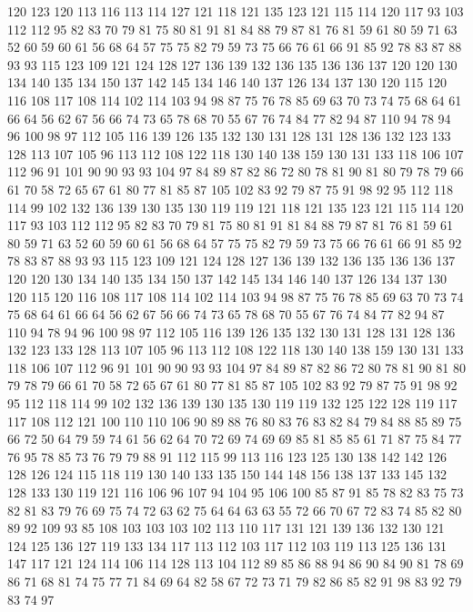 120 123 120 113 116 113 114 127 121 118 121 135 123 121 115 114 120 117 93 103
112 112 95 82 83 70 79 81 75 80 81 91 81 84 88 79 87 81 76 81
59 61 80 59 71 63 52 60 59 60 61 56 68 64 57 75 75 82 79 59
73 75 66 76 61 66 91 85 92 78 83 87 88 93 93 115 123 109 121 124
128 127 136 139 132 136 135 136 136 137 120 120 130 134 140 135 134 150 137 142
145 134 146 140 137 126 134 137 130 120 115 120 116 108 117 108 114 102 114 103
94 98 87 75 76 78 85 69 63 70 73 74 75 68 64 61 66 64 56 62
67 56 66 74 73 65 78 68 70 55 67 76 74 84 77 82 94 87 110 94
78 94 96 100 98 97 112 105 116 139 126 135 132 130 131 128 131 128 136 132
123 133 128 113 107 105 96 113 112 108 122 118 130 140 138 159 130 131 133 118
106 107 112 96 91 101 90 90 93 93 104 97 84 89 87 82 86 72 80 78
81 90 81 80 79 78 79 66 61 70 58 72 65 67 61 80 77 81 85 87
105 102 83 92 79 87 75 91 98 92 95 112 118 114 99 102 132 136 139 130
135 130 119 119 121 118 121 135 123 121 115 114 120 117 93 103 112 112 95 82
83 70 79 81 75 80 81 91 81 84 88 79 87 81 76 81 59 61 80 59
71 63 52 60 59 60 61 56 68 64 57 75 75 82 79 59 73 75 66 76
61 66 91 85 92 78 83 87 88 93 93 115 123 109 121 124 128 127 136 139
132 136 135 136 136 137 120 120 130 134 140 135 134 150 137 142 145 134 146 140
137 126 134 137 130 120 115 120 116 108 117 108 114 102 114 103 94 98 87 75
76 78 85 69 63 70 73 74 75 68 64 61 66 64 56 62 67 56 66 74
73 65 78 68 70 55 67 76 74 84 77 82 94 87 110 94 78 94 96 100
98 97 112 105 116 139 126 135 132 130 131 128 131 128 136 132 123 133 128 113
107 105 96 113 112 108 122 118 130 140 138 159 130 131 133 118 106 107 112 96
91 101 90 90 93 93 104 97 84 89 87 82 86 72 80 78 81 90 81 80
79 78 79 66 61 70 58 72 65 67 61 80 77 81 85 87 105 102 83 92
79 87 75 91 98 92 95 112 118 114 99 102 132 136 139 130 135 130 119 119
132 125 122 128 119 117 117 108 112 121 100 110 110 106 90 89 88 76 80 83
76 83 82 84 79 84 88 85 89 75 66 72 50 64 79 59 74 61 56 62
64 70 72 69 74 69 69 85 81 85 85 61 71 87 75 84 77 76 95 78
85 73 76 79 79 88 91 112 115 99 113 116 123 125 130 138 142 142 126 128
126 124 115 118 119 130 140 133 135 150 144 148 156 138 137 133 145 132 128 133
130 119 121 116 106 96 107 94 104 95 106 100 85 87 91 85 78 82 83 75
73 82 81 83 79 76 69 75 74 72 63 62 75 64 64 63 63 55 72 66
70 67 72 83 74 85 82 80 89 92 109 93 85 108 103 103 103 102 113 110
117 131 121 139 136 132 130 121 124 125 136 127 119 133 134 117 113 112 103 117
112 103 119 113 125 136 131 147 117 121 124 114 106 114 128 113 104 112 89 85
86 88 94 86 90 84 90 81 78 69 86 71 68 81 74 75 77 71 84 69
64 82 58 67 72 73 71 79 82 86 85 82 91 98 83 92 79 83 74 97
